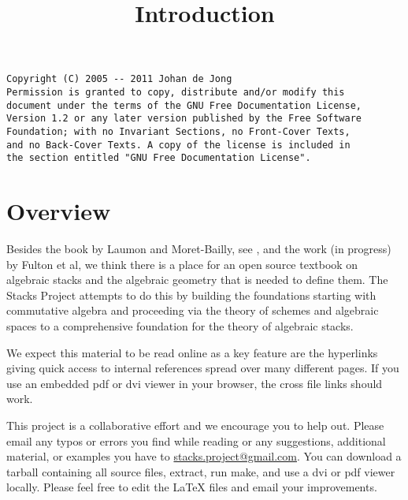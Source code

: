 

%


\title{Introduction}


\maketitle

\label{section-phantom}

\begin{verbatim}
Copyright (C) 2005 -- 2011 Johan de Jong
Permission is granted to copy, distribute and/or modify this
document under the terms of the GNU Free Documentation License,
Version 1.2 or any later version published by the Free Software
Foundation; with no Invariant Sections, no Front-Cover Texts,
and no Back-Cover Texts. A copy of the license is included in
the section entitled "GNU Free Documentation License".
\end{verbatim}

\tableofcontents


\section{Overview}
\label{section-overview}

\noindent
Besides the book by Laumon and Moret-Bailly, see \cite{LM-B}, and the work
(in progress) by Fulton et al, we think there is a place for an open source
textbook on algebraic stacks and the algebraic geometry that is needed
to define them. The Stacks Project attempts to do this by building the
foundations starting with commutative algebra and proceeding via the
theory of schemes and algebraic spaces to a comprehensive foundation for
the theory of algebraic stacks.

\medskip\noindent
We expect this material to be read online as a key feature are the hyperlinks
giving quick access to internal references spread over many different pages.
If you use an embedded pdf or dvi viewer in your browser, the cross file
links should work.

\medskip\noindent
This project is a collaborative effort and we encourage you to help out.
Please email any typos or errors you find while reading or
any suggestions, additional material, or examples you have to
\href{mailto:stacks.project@gmail.com}{stacks.project@gmail.com}.
You can download a tarball containing all source files, extract,
run make, and use a dvi or pdf viewer locally. Please feel free to
edit the LaTeX files and email your improvements.


